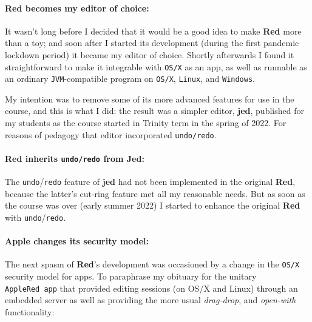 \documentclass[12pt,a4paper]{article}
\begin{document}
\hypertarget{red-becomes-my-editor-of-choice}{%
\paragraph{Red becomes my editor of
choice:}\label{red-becomes-my-editor-of-choice}}

It wasn't long before I decided that it would be a good idea to make
\textbf{Red} more than a toy; and soon after I started its development
(during the first pandemic lockdown period) it became my editor of
choice. Shortly afterwards I found it straightforward to make it
integrable with \texttt{OS/X} as an app, as well as runnable as an
ordinary \texttt{JVM}-compatible program on \texttt{OS/X},
\texttt{Linux}, and \texttt{Windows}.

My intention was to remove some of its more advanced features for use in
the course, and this is what I did: the result was a simpler editor,
\textbf{jed}, published for my students as the course started in Trinity
term in the spring of 2022. For reasons of pedagogy that editor
incorporated \texttt{undo/redo}.

\hypertarget{red-inherits-undoredo-from-jed}{%
\paragraph{\texorpdfstring{Red inherits \texttt{undo/redo} from
Jed:}{Red inherits undo/redo from Jed:}}\label{red-inherits-undoredo-from-jed}}

The \texttt{undo}/\texttt{redo} feature of \textbf{jed} had not been
implemented in the original \textbf{Red}, because the latter's cut-ring
feature met all my reasonable needs. But as soon as the course was over
(early summer 2022) I started to enhance the original \textbf{Red} with
\texttt{undo}/\texttt{redo}.

\hypertarget{apple-changes-its-security-model}{%
\paragraph{Apple changes its security
model:}\label{apple-changes-its-security-model}}

The next spasm of \textbf{Red}'s development was occasioned by a change
in the \texttt{OS/X} security model for apps. To paraphrase my obituary
for the unitary \texttt{AppleRed\ app} that provided editing sessions
(on OS/X and Linux) through an embedded server as well as providing the
more usual \emph{drag-drop}, and \emph{open-with} functionality:
\end{document}

